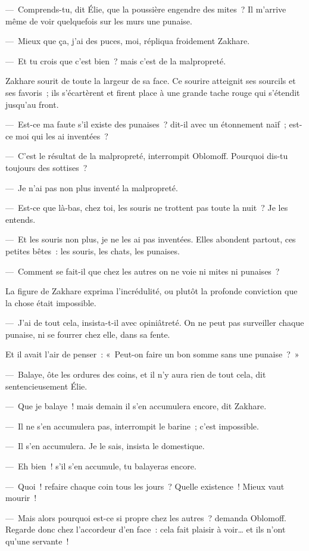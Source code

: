 \documentclass[french,twoside]{book} %
\begin{document}
— Comprends-tu, dit Élie, que la poussière engendre des mites ? Il m’arrive même de voir quelquefois sur les murs une punaise.\par
— Mieux que ça, j’ai des puces, moi, répliqua froidement Zakhare.\par
— Et tu crois que c’est bien ? mais c’est de la malpropreté.\par
Zakhare sourit de toute la largeur de sa face. Ce sourire atteignit ses sourcils et ses favoris ; ils s’écartèrent et firent place à une grande tache rouge qui s’étendit jusqu’au front.\par
— Est-ce ma faute s’il existe des punaises ? dit-il avec un étonnement naïf ; est-ce moi qui les ai inventées ?\par
— C’est le résultat de la malpropreté, interrompit Oblomoff. Pourquoi dis-tu toujours des sottises ?\par
— Je n’ai pas non plus inventé la malpropreté.\par
— Est-ce que là-bas, chez toi, les souris ne trottent pas toute la nuit ? Je les entends.\par
— Et les souris non plus, je ne les ai pas inventées. Elles abondent partout, ces petites bêtes : les souris, les chats, les punaises.\par
— Comment se fait-il que chez les autres on ne voie ni mites ni punaises ?\par
La figure de Zakhare exprima l’incrédulité, ou plutôt la profonde conviction que la chose était impossible.\par
— J’ai de tout cela, insista-t-il avec opiniâtreté. On ne peut pas surveiller chaque punaise, ni se fourrer chez elle, dans sa fente.\par
Et il avait l’air de penser : « Peut-on faire un bon somme sans une punaise ? »\par
— Balaye, ôte les ordures des coins, et il n’y aura rien de tout cela, dit sentencieusement Élie.\par
— Que je balaye ! mais demain il s’en accumulera encore, dit Zakhare.\par
— Il ne s’en accumulera pas, interrompit le barine ; c’est impossible.\par
— Il s’en accumulera. Je le sais, insista le domestique.\par
— Eh bien ! s’il s’en accumule, tu balayeras encore.\par
— Quoi ! refaire chaque coin tous les jours ? Quelle existence ! Mieux vaut mourir !\par
— Mais alors pourquoi est-ce si propre chez les autres ? demanda Oblomoff. Regarde donc chez l’accordeur d’en face : cela fait plaisir à voir… et ils n’ont qu’une servante !\par
\end{document}
